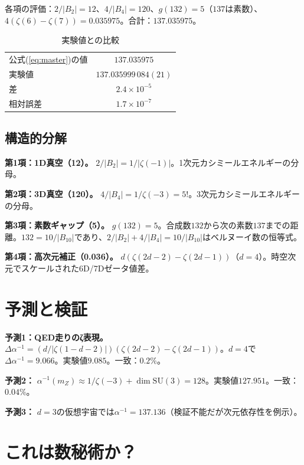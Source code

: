 \documentclass[11pt,a4paper]{article}
\begin{document}
各項の評価：$2/|B_2| = 12$、$4/|B_4| = 120$、$g(132) = 5$（$137$は素数）、$4(\zeta(6) - \zeta(7)) = 0.035975$。合計：$137.035975$。

\begin{table}[h]
\centering
\caption{実験値との比較}
\begin{tabular}{@{}lc@{}}
\toprule
公式(\ref{eq:master})の値 & $137.035975$ \\
実験値~\cite{Mohr2016} & $137.035999\,084(21)$ \\
\midrule
差 & $2.4 \times 10^{-5}$ \\
相対誤差 & $1.7 \times 10^{-7}$ \\
\bottomrule
\end{tabular}
\end{table}

\subsection{構造的分解}

\textbf{第1項：1D真空（12）。} $2/|B_2| = 1/|\zeta(-1)|$。1次元カシミールエネルギーの分母。

\textbf{第2項：3D真空（120）。} $4/|B_4| = 1/\zeta(-3) = 5!$。3次元カシミールエネルギーの分母。

\textbf{第3項：素数ギャップ（5）。} $g(132) = 5$。合成数$132$から次の素数$137$までの距離。$132 = 10/|B_{10}|$であり、$2/|B_2| + 4/|B_4| = 10/|B_{10}|$はベルヌーイ数の恒等式。

\textbf{第4項：高次元補正（0.036）。} $d(\zeta(2d-2) - \zeta(2d-1))$（$d = 4$）。時空次元でスケールされた6D/7Dゼータ値差。

\section{予測と検証}

\textbf{予測1：QED走りのζ表現。} $\Delta\alpha^{-1} = (d/|\zeta(1-d-2)|)(\zeta(2d-2) - \zeta(2d-1))$。$d=4$で$\Delta\alpha^{-1} = 9.066$。実験値$9.085$。一致：$0.2\%$。

\textbf{予測2：} $\alpha^{-1}(m_Z) \approx 1/\zeta(-3) + \dim\mathrm{SU}(3) = 128$。実験値$127.951$。一致：$0.04\%$。

\textbf{予測3：} $d = 3$の仮想宇宙では$\alpha^{-1} = 137.136$（検証不能だが次元依存性を例示）。

\section{これは数秘術か？}
\end{document}
